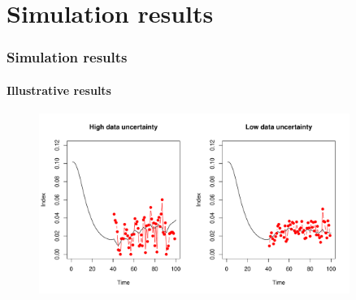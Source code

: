 \documentclass[pdf]{beamer}
\begin{document}
\section{Simulation results}
\begin{frame}
\frametitle{Simulation results}
\framesubtitle{Illustrative results}
\begin{figure}
\includegraphics[width=0.9\textwidth]{../res/uncertainty_index.pdf}
\end{figure}
\end{frame}
\end{document}
